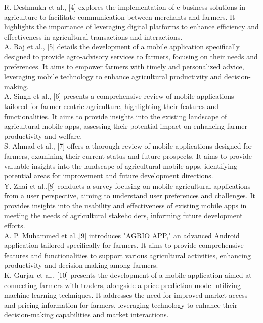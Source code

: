 \documentclass{article}
\begin{document}
R. Deshmukh et al., [4] explores the implementation of e-business solutions in agriculture to facilitate communication between merchants and farmers. It highlights the importance of leveraging digital platforms to enhance efficiency and effectiveness in agricultural transactions and interactions.\\

    A. Raj et al., [5] details the development of a mobile application specifically designed to provide agro-advisory services to farmers, focusing on their needs and preferences. It aims to empower farmers with timely and personalized advice, leveraging mobile technology to enhance agricultural productivity and decision-making.\\
    
    A. Singh et al., [6] presents a comprehensive review of mobile applications tailored for farmer-centric agriculture, highlighting their features and functionalities. It aims to provide insights into the existing landscape of agricultural mobile apps, assessing their potential impact on enhancing farmer productivity and welfare.\\
    
    S. Ahmad et al., [7] offers a thorough review of mobile applications designed for farmers, examining their current status and future prospects. It aims to provide valuable insights into the landscape of agricultural mobile apps, identifying potential areas for improvement and future development directions.\\
    
    Y. Zhai et al.,[8] conducts a survey focusing on mobile agricultural applications from a user perspective, aiming to understand user preferences and challenges. It provides insights into the usability and effectiveness of existing mobile apps in meeting the needs of agricultural stakeholders, informing future development efforts.\\
    
    A. P. Muhammed et al.,[9] introduces "AGRIO APP," an advanced Android application tailored specifically for farmers. It aims to provide comprehensive features and functionalities to support various agricultural activities, enhancing productivity and decision-making among farmers.\\
    
    K. Gurjar et al., [10] presents the development of a mobile application aimed at connecting farmers with traders, alongside a price prediction model utilizing machine learning techniques. It addresses the need for improved market access and pricing information for farmers, leveraging technology to enhance their decision-making capabilities and market interactions.\\
    
\end{document}
